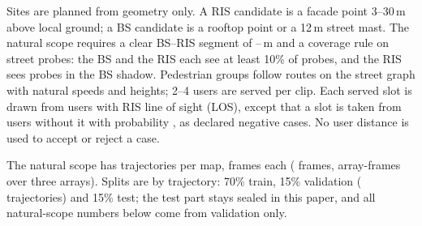 \documentclass[runningheads]{llncs}
\begin{document}
Sites are planned from geometry only. A RIS candidate is a facade point 3--30\,m above local ground; a BS candidate is a rooftop point or a 12\,m street mast. The natural scope requires a clear BS--RIS segment of --\,m and a coverage rule on street probes: the BS and the RIS each see at least 10\% of probes, and the RIS sees probes in the BS shadow. Pedestrian groups follow routes on the street graph with natural speeds and heights; 2--4 users are served per clip. Each served slot is drawn from users with RIS line of sight (LOS), except that a slot is taken from users without it with probability , as declared negative cases. No user distance is used to accept or reject a case.

The natural scope has  trajectories per map,  frames each ( frames,  array-frames over three arrays). Splits are by trajectory: 70\% train, 15\% validation ( trajectories) and 15\% test; the test part stays sealed in this paper, and all natural-scope numbers below come from validation only.
\end{document}
